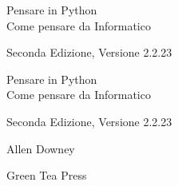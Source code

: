 \documentclass[10pt]{book}
\newcommand{\theversion}{Seconda Edizione, Versione 2.2.23}
\newcommand{\thedate}{}
\begin{document}
\begin{latexonly}

\renewcommand{\blankpage}{\thispagestyle{empty} \quad \newpage}



\thispagestyle{empty}

\begin{flushright}
\vspace*{2.0in}

\begin{spacing}{3}
{\huge Pensare in Python}\\
{\Large Come pensare da Informatico}
\end{spacing}

\vspace{0.25in}

\theversion

\thedate

\vfill

\end{flushright}


\blankpage
\blankpage

\pagebreak
\thispagestyle{empty}

\begin{flushright}
\vspace*{2.0in}

\begin{spacing}{3}
{\huge Pensare in Python}\\
{\Large Come pensare da Informatico}
\end{spacing}

\vspace{0.25in}

\theversion

\thedate

\vspace{1in}


{\Large
Allen Downey\\
}


\vspace{0.5in}

{\Large Green Tea Press}


\end{flushright}
\end{latexonly}
\end{document}
